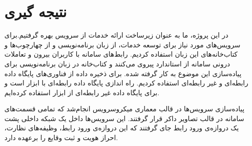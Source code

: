 \section{نتیجه گیری}

در این پروژه، ما به عنوان زیرساخت ارائه خدمات  از سرویس  بهره گرفتیم.برای سرویس‌های مورد نیاز برای توسعه خدمات، از زبان برنامه‌نویسی  و از چهارچوب‌ها و کتاب‌خانه‌های این زبان استفاده کردیم. رابط‌های سامانه با کاربران بیرون و تعاملات درونی سامانه از استاندارد  پیروی می‌کنند و کتاب‌خانه  در زبان برنامه‌نویسی  برای پیاده‌سازی این موضوع به کار گرفته شده. برای ذخیره داده از فناوری‌های پایگاه داده رابطه‌ای و غیر رابطه‌ای استفاده کردیم. راه اندازی پایگاه داده رابطه‌ای با ابزار  است و برای پایگاه داده غیر رابطه‌ای از ابزار  استفاده کرده‌ایم.

پیاده‌سازی سرویس‌ها در قالب معماری میکروسرویس انجام‌شد که تمامی قسمت‌های سامانه در قالب تصاویر داکر قرار گرفتند. این سرویس‌ها داخل یک شبکه داخلی پشت یک ‌دروازه‌ی ورود رابط جای گرفتند که این ‌دروازه‌ی ورود رابط، وظیفه‌های نظارت، احراز هویت و ثبت وقایع را برعهده دارد.